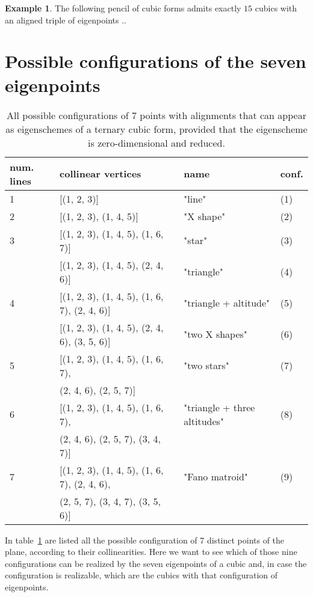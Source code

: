 \documentclass[11pt, a4paper, reqno, captions=tableheading,bibliography=totoc]{scrartcl}
\theoremstyle{plain}
\theoremstyle{definition}
\newtheorem{es}[lemma]{Example}
\begin{document}
\begin{es}
The following pencil of cubic forms admits exactly $15$ cubics with an aligned triple of eigenpoints ..
\end{es}

\section{Possible configurations of the seven eigenpoints}
\label{further_alignments}

\begin{table}
\label{table:all_alignments}
\caption{All possible configurations of $7$ points with alignments that can appear as eigenschemes of a ternary cubic form, provided that the eigenscheme is zero-dimensional and reduced.}
\centering
\begin{tabular}{|llll|}\hline
  num. lines  & collinear vertices & name & conf.\\ \hline
 1& [(1, 2, 3)] & "line" & (1)\\
 2& [(1, 2, 3), (1, 4, 5)] & "X shape"& (2)\\
 3& [(1, 2, 3), (1, 4, 5), (1, 6, 7)] & "star" & (3)\\
  & [(1, 2, 3), (1, 4, 5), (2, 4, 6)] & "triangle" & (4)\\
 4& [(1, 2, 3), (1, 4, 5), (1, 6, 7), (2, 4, 6)] & "triangle + altitude" & (5)\\
  & [(1, 2, 3), (1, 4, 5), (2, 4, 6), (3, 5, 6)] & "two X shapes" & (6)\\
 5& [(1, 2, 3), (1, 4, 5), (1, 6, 7),  & "two stars" & (7)\\
  & \phantom{[}(2, 4, 6), (2, 5, 7)] & &\\
 6& [(1, 2, 3), (1, 4, 5), (1, 6, 7), & "triangle + three altitudes" & (8)\\
  & \phantom{[} (2, 4, 6), (2, 5, 7), (3, 4, 7)] & & \\
 7& [(1, 2, 3),
   (1, 4, 5),
   (1, 6, 7),
   (2, 4, 6), & "Fano matroid" & (9)\\
  & \phantom{[} (2, 5, 7),
   (3, 4, 7),
   (3, 5, 6)] & & \\ \hline
\end{tabular}
\end{table}

In table~\ref{table:all_alignments} are listed all the possible configuration
of 7 distinct points of the plane, according to their collinearities. Here
we want to see which of those nine configurations can be realized by
the seven eigenpoints of a cubic and, in case the configuration is
realizable, which are the cubics with that configuration of eigenpoints.
\end{document}
